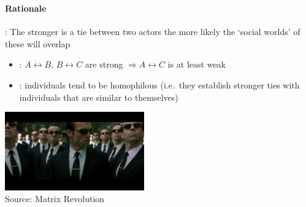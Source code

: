 \documentclass[8pt]{beamer}
\begin{document}
\begin{frame}
\frametitle{\insertsection}
\framesubtitle{Rationale}


{\color{blue}{Premise 1}}: The stronger is a tie between two actors the more likely the `social worlds' of these will overlap
    
\begin{itemize}
\item {\color{blue}{Transitivity}}: $A \leftrightarrow B$, $B \leftrightarrow C$ are strong $\Rightarrow A\leftrightarrow C$ is at least weak
\item {\color{blue}{Homophily}}: individuals tend to be homophilous (i.e.\ they establish stronger ties with individuals that are similar to themselves) \cite{McPherson2001}
\end{itemize}

\medskip
\medskip

\centering
\includegraphics[width=6cm]{homophily}\\
{\tiny Source: Matrix Revolution}

\end{frame}

\end{document}
